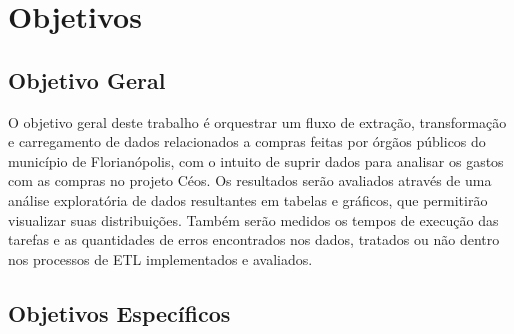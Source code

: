 



\section{Objetivos}
\subsection{Objetivo Geral}

O objetivo geral deste trabalho é orquestrar um fluxo de extração, transformação e carregamento de dados relacionados a compras feitas por órgãos públicos do município de Florianópolis, com o intuito de suprir dados para  analisar os gastos com as compras no projeto Céos. Os resultados serão avaliados através de uma análise exploratória de dados resultantes em tabelas e gráficos, que permitirão visualizar suas distribuições. Também serão medidos os tempos de execução das tarefas e as quantidades de erros encontrados nos dados, tratados ou não dentro nos processos de ETL implementados e avaliados.

\subsection{Objetivos Específicos}

